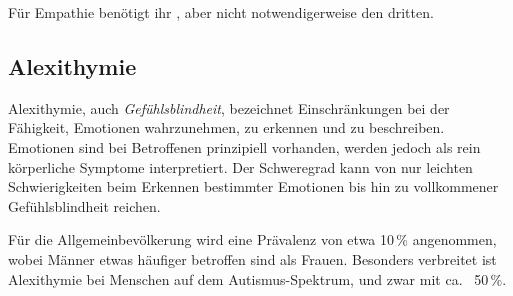 Für Empathie benötigt ihr , aber nicht notwendigerweise den dritten.



\subsection{Alexithymie}
\label{alexithymie}

Alexithymie, auch \emph{Gefühlsblindheit}, bezeichnet Einschränkungen bei der Fähigkeit, Emotionen wahrzunehmen, zu erkennen und zu beschreiben. Emotionen sind bei Betroffenen prinzipiell vorhanden, werden jedoch als rein körperliche Symptome interpretiert. Der Schweregrad kann von nur leichten Schwierigkeiten beim Erkennen bestimmter Emotionen bis hin zu vollkommener \glqq Gefühlsblindheit\grqq{} reichen.

Für die Allgemeinbevölkerung wird eine Prävalenz von etwa 10\,\% angenommen, wobei Männer etwas häufiger betroffen sind als Frauen. Besonders verbreitet ist Alexithymie bei Menschen auf dem Autismus-Spektrum, und zwar mit ca.~ 50\,\%.
